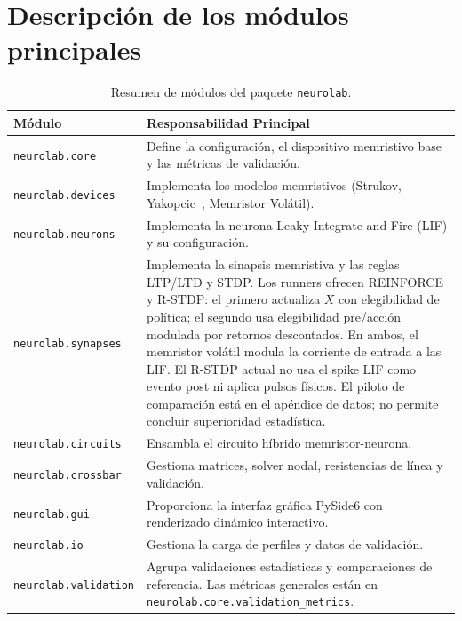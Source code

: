 \section{Descripción de los módulos principales}
\label{sec:descripcion_modulos}

\begin{table}[H]
\caption{Resumen de módulos del paquete \texttt{neurolab}.}
\label{tab:modulos_neurolab}
\centering
\begin{tabular}{l p{10cm}}
\toprule
Módulo & Responsabilidad Principal \\
\midrule
\texttt{neurolab.core} & Define la configuración, el dispositivo memristivo base y las métricas de validación. \\
\texttt{neurolab.devices} & Implementa los modelos memristivos (Strukov, Yakopcic~\cite{32}, Memristor Volátil). \\
\texttt{neurolab.neurons} & Implementa la neurona Leaky Integrate-and-Fire (LIF) y su configuración. \\
\texttt{neurolab.synapses} & Implementa la sinapsis memristiva y las reglas LTP/LTD y STDP. Los runners ofrecen REINFORCE y R-STDP: el primero actualiza $X$ con elegibilidad de pol\'itica; el segundo usa elegibilidad pre/acci\'on modulada por retornos descontados. En ambos, el memristor vol\'atil modula la corriente de entrada a las LIF. El R-STDP actual no usa el spike LIF como evento post ni aplica pulsos f\'isicos. El piloto de comparaci\'on est\'a en el ap\'endice de datos; no permite concluir superioridad estad\'istica. \\
\texttt{neurolab.circuits} & Ensambla el circuito híbrido memristor-neurona. \\
\texttt{neurolab.crossbar} & Gestiona matrices, solver nodal, resistencias de línea y validación. \\
\texttt{neurolab.gui} & Proporciona la interfaz gráfica PySide6 con renderizado dinámico interactivo. \\
\texttt{neurolab.io} & Gestiona la carga de perfiles y datos de validación. \\
\texttt{neurolab.validation} & Agrupa validaciones estadísticas y comparaciones de referencia. Las métricas generales están en \texttt{neurolab.core.\allowbreak{}validation\_metrics}. \\
\bottomrule
\end{tabular}
\end{table}

